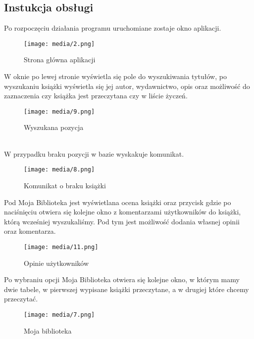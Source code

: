 \documentclass[12pt,a4paper]{article}
\begin{document}
\subsection{Instukcja obsługi}
Po rozpoczęciu działania programu uruchomiane zostaje okno aplikacji.
\begin{figure}[!h]
    \centering
    \texttt{[image: media/2.png]}
    \caption{Strona główna aplikacji}
\end{figure}
\clearpage
W oknie po lewej stronie wyświetla się pole do wyszukiwania tytułów, po wyszukaniu książki wyświetla się jej autor, wydawnictwo, opis oraz możliwość do zaznaczenia czy książka jest przeczytana czy w liście życzeń. 
\begin{figure}[!h]
    \centering
    \texttt{[image: media/9.png]}
    \caption{Wyszukana pozycja}
\end{figure}
\\
W przypadku braku pozycji w bazie wyskakuje komunikat.
\begin{figure}[!h]
    \centering
    \texttt{[image: media/8.png]}
    \caption{Komunikat o braku książki}
\end{figure}
\clearpage
Pod Moja Biblioteka jest wyświetlana ocena książki oraz przycisk gdzie po naciśnięciu otwiera się kolejne okno z komentarzami użytkowników do książki, którą wcześniej wyszukaliśmy. Pod tym jest możliwość dodania własnej opinii oraz komentarza.
\begin{figure}[!h]
    \centering
    \texttt{[image: media/11.png]}
    \caption{Opinie użytkowników}
\end{figure}
\clearpage
Po wybraniu opcji Moja Biblioteka otwiera się kolejne okno, w którym mamy dwie tabele, w pierwszej wypisane książki przeczytane, a w drugiej które chcemy przeczytać.
\begin{figure}[!h]
    \centering
    \texttt{[image: media/7.png]}
    \caption{Moja biblioteka}
\end{figure}
\end{document}
